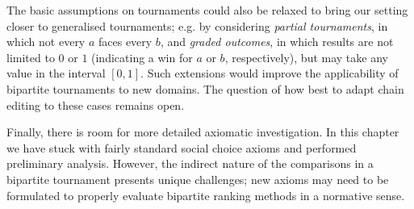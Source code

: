 
The basic assumptions on tournaments could also be relaxed to bring our setting
closer to generalised tournaments; e.g. by considering \emph{partial
tournaments}, in which not every $a$ faces every $b$, and \emph{graded
outcomes}, in which results are not limited to $0$ or $1$ (indicating a win for
$a$ or $b$, respectively), but may take any value in the interval $[0, 1]$.
Such extensions would improve the applicability of bipartite tournaments to new
domains. The question of how best to adapt chain editing to these cases remains
open.

Finally, there is room for more detailed axiomatic investigation. In this
chapter we have stuck with fairly standard social choice axioms and performed
preliminary analysis. However, the indirect nature of the comparisons in a
bipartite tournament presents unique challenges; new axioms may need to be
formulated to properly evaluate bipartite ranking methods in a normative sense.
